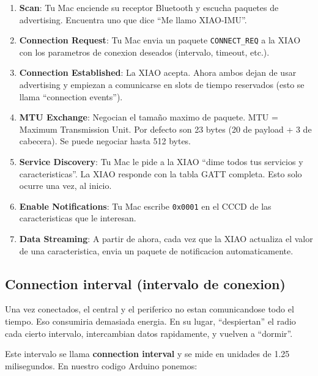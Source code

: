 \documentclass[11pt,a4paper]{article}
\begin{document}
\begin{enumerate}
    \item \textbf{Scan}: Tu Mac enciende su receptor Bluetooth y
          escucha paquetes de advertising. Encuentra uno que dice
          ``Me llamo XIAO-IMU''.

    \item \textbf{Connection Request}: Tu Mac envia un paquete
          \texttt{CONNECT\_REQ} a la XIAO con los parametros de
          conexion deseados (intervalo, timeout, etc.).

    \item \textbf{Connection Established}: La XIAO acepta. Ahora
          ambos dejan de usar advertising y empiezan a comunicarse
          en slots de tiempo reservados (esto se llama
          ``connection events'').

    \item \textbf{MTU Exchange}: Negocian el tamaño maximo de
          paquete. MTU = Maximum Transmission Unit. Por defecto
          son 23 bytes (20 de payload + 3 de cabecera). Se puede
          negociar hasta 512 bytes.

    \item \textbf{Service Discovery}: Tu Mac le pide a la XIAO
          ``dime todos tus servicios y caracteristicas''. La XIAO
          responde con la tabla GATT completa. Esto solo ocurre
          una vez, al inicio.

    \item \textbf{Enable Notifications}: Tu Mac escribe
          \texttt{0x0001} en el CCCD de las caracteristicas que le
          interesan.

    \item \textbf{Data Streaming}: A partir de ahora, cada vez que
          la XIAO actualiza el valor de una caracteristica, envia
          un paquete de notificacion automaticamente.
\end{enumerate}

\subsection{Connection interval (intervalo de conexion)}

Una vez conectados, el central y el periferico no estan comunicandose
todo el tiempo. Eso consumiria demasiada energia. En su lugar,
``despiertan'' el radio cada cierto intervalo, intercambian datos
rapidamente, y vuelven a ``dormir''.

Este intervalo se llama \textbf{connection interval} y se mide en
unidades de 1.25 milisegundos. En nuestro codigo Arduino ponemos:
\end{document}
